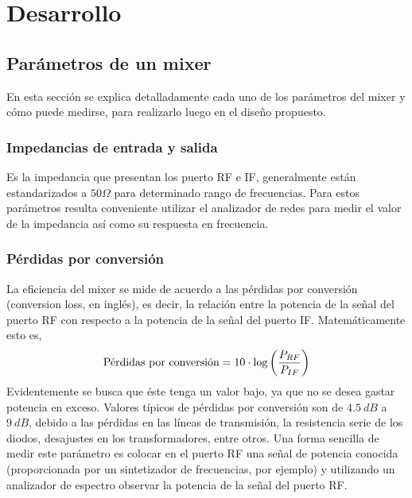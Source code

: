 \documentclass[a4paper,10pt]{article}
\begin{document}
\newpage
\section{Desarrollo}
	\subsection{Parámetros de un mixer}
	En esta secci\'on se explica detalladamente cada uno de los par\'ametros del mixer y c\'omo puede medirse, para realizarlo luego en el dise\~no propuesto.
		\subsubsection{Impedancias de entrada y salida}
		Es la impedancia que presentan los puerto RF e IF, generalmente est\'an estandarizados a $50\Omega$ para determinado rango de frecuencias. Para estos par\'ametros resulta conveniente utilizar el analizador de redes para medir el valor de la impedancia as\'i como su respuesta en frecuencia.
		\subsubsection{P\'erdidas por conversi\'on}
		\indent La eficiencia del mixer se mide de acuerdo a las p\'erdidas por conversi\'on (conversion loss, en ingl\'es), es decir, la 
		relación entre la potencia de la señal del puerto RF con respecto a la potencia de la señal del puerto IF. Matem\'aticamente esto es,
		$$\textmd{P\'erdidas por conversi\'on}=10\cdot\log\left(\frac{P_{RF}}{P_{IF}}\right)$$
		Evidentemente se busca que \'este tenga un valor bajo, ya que no se desea gastar potencia en exceso. Valores t\'ipicos de p\'erdidas por conversi\'on son de $4.5~dB$ a $9~dB$, debido a las p\'erdidas en las l\'ineas de transmisi\'on, la resistencia serie de los diodos, desajustes en los transformadores, entre otros.
		Una forma sencilla de medir este par\'ametro es colocar en el puerto RF una señal de potencia conocida (proporcionada por un sintetizador de frecuencias, por ejemplo) y utilizando un analizador de espectro observar la potencia de la señal del puerto RF.
		
\end{document}
